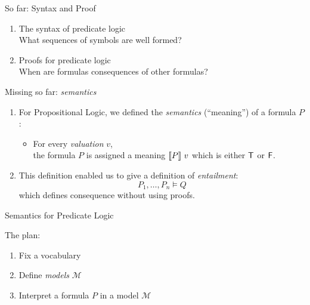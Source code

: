 \documentclass[xetex,aspectratio=169,14pt,hyperref={pdfpagelabels=true,pdflang={en-GB}}]{beamer}
\begin{document}
\frame{\titlepage}


\begin{frame}
  {So far: Syntax and Proof}

  \begin{enumerate}
  \item The syntax of predicate logic \\
    \textcolor{black!60}{What sequences of symbols are well formed?}
  \item Proofs for predicate logic \\
    \textcolor{black!60}{When are formulas consequences of other formulas?}
  \end{enumerate}
\end{frame}

\begin{frame}
  {Missing so far: \emph{semantics}}
  \begin{enumerate}
  \item For Propositional Logic, we defined the \emph{semantics}
    (``meaning'') of a formula $P$:
    \begin{itemize}
    \item For every \emph{valuation} $v$,\\
      the formula $P$ is assigned a meaning $\llbracket P \rrbracket~v$ which is either $\mathsf{T}$ or $\mathsf{F}$.
    \end{itemize}
  \item This definition enabled us to give a definition of
    \emph{entailment}:
    \begin{displaymath}
      P_1, \dots, P_n \models Q
    \end{displaymath}
    which defines consequence without using proofs.
  \end{enumerate}
\end{frame}

\begin{frame}
  {Semantics for Predicate Logic}

  The plan:
  \begin{enumerate}
  \item Fix a vocabulary
  \item Define \emph{models} $\mathcal{M}$
  \item Interpret a formula $P$ in a model $\mathcal{M}$
  \end{enumerate}
\end{frame}
\end{document}

